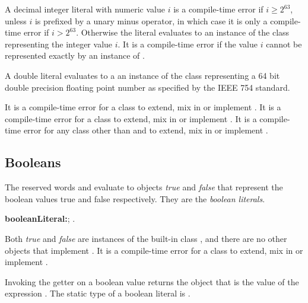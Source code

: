 \documentclass{article}
\begin{document}
\LMHash{}
A decimal integer literal with numeric value $i$ is a compile-time error
if $i \ge{} 2^{63}$, unless $i$ is prefixed by a unary minus operator,
in which case it is only a compile-time error if $i \gt{} 2^{63}$.
Otherwise the literal evaluates to an instance of the  class representing
the integer value $i$.
It is a compile-time error if the value $i$ cannot be represented exactly
by an instance of .

\LMHash{}
A double literal evaluates to a an instance of the  class
representing a 64 bit double precision floating point number
as specified by the IEEE 754 standard.


\LMHash{}
It is a compile-time error for a class to extend, mix in or implement .
It is a compile-time error for a class to extend, mix in or implement .
It is a compile-time error for any class other than  and  to extend, mix in or implement .


\subsection{Booleans}

\LMHash{}
The reserved words \TRUE{} and \FALSE{} evaluate to objects {\em true} and {\em false} that represent the boolean values true and false respectively.
They are the {\em boolean literals}.

\begin{grammar}
{\bf booleanLiteral:}\TRUE{};
  \FALSE{}
  .
\end{grammar}

\LMHash{}
Both {\em true} and {\em false} are instances of the built-in class ,
and there are no other objects that implement .
It is a compile-time error for a class to extend, mix in or implement .

\LMHash{}
Invoking the getter  on a boolean value returns the  object that is the value of the expression .
The static type of a boolean literal is .
\end{document}
